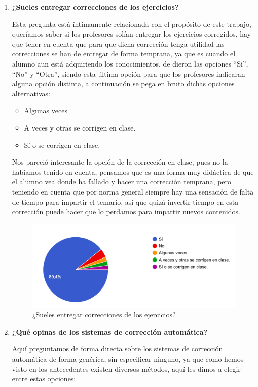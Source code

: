 \begin{enumerate}
\item \textbf{¿Sueles entregar correcciones de los ejercicios?}

Esta pregunta está íntimamente relacionada con el propósito de este trabajo, queríamos saber si los profesores solían entregar los ejercicios corregidos, hay que tener en cuenta que para que dicha corrección tenga utilidad las correcciones se han de entregar de forma temprana, ya que es cuando el alumno aun está adquiriendo los conocimientos, de dieron las opciones ``Si'', ``No'' y ``Otra'', siendo esta última opción para que los profesores indicaran alguna opción distinta, a continuación se pega en bruto dichas opciones alternativas:

\begin{itemize}
    \item Algunas veces
    \item A veces y otras se corrigen en clase.
    \item Sí o se corrigen en clase.
\end{itemize}

Nos pareció interesante la opción de la corrección en clase, pues no la habíamos tenido en cuenta, pensamos que es una forma muy didáctica de que el alumno vea donde ha fallado y hacer una corrección temprana, pero teniendo en cuenta que por norma general siempre hay una sensación de falta de tiempo para impartir el temario, así que quizá invertir tiempo en esta corrección puede hacer que lo perdamos para impartir nuevos contenidos.

\begin{figure}[H]
\centering
\includegraphics[width=1.0\textwidth]{../images/quiz_5}
\caption{¿Sueles entregar correcciones de los ejercicios?}
\label{fig:quiz_5}
\end{figure}

\item \textbf{¿Qué opinas de los sistemas de corrección automática?}

Aquí preguntamos de forma directa sobre los sistemas de corrección automática de forma genérica, sin especificar ninguno, ya que como hemos visto en los antecedentes existen diversos métodos, aquí les dimos a elegir entre estas opciones:


\end{enumerate}
